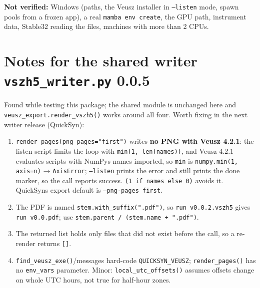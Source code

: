 \documentclass[10pt,a4paper]{article}
\providecommand{\tightlist}{\setlength{\itemsep}{0pt}\setlength{\parskip}{0pt}}
\begin{document}
\textbf{Not verified:} Windows (paths, the Veusz installer in \texttt{--listen} mode,
spawn pools from a frozen app), a real \texttt{mamba env create}, the GPU path,
instrument data, Stable32 reading the files, machines with more than 2 CPUs.


\hypertarget{notes-for-the-shared-writer-vszh5_writerpy-005}{%
\section{\texorpdfstring{Notes for the shared writer \texttt{vszh5\_writer.py} 0.0.5}{Notes for the shared writer vszh5\_writer.py 0.0.5}}\label{notes-for-the-shared-writer-vszh5_writerpy-005}}

Found while testing this package; the shared module is unchanged here and
\texttt{veusz\_\allowbreak{}export.\allowbreak{}render\_\allowbreak{}vszh5()} works around all four. Worth fixing in the next
writer release (QuickSyn):

\begin{enumerate}
\def\labelenumi{\arabic{enumi}.}
\tightlist
\item
  \texttt{render\_\allowbreak{}pages(png\_\allowbreak{}pages=\allowbreak{}"first")} writes \textbf{no PNG with Veusz 4.2.1}: the
  listen script limits the loop with \texttt{min(1,\allowbreak{} len(names))}, and Veusz 4.2.1
  evaluates scripts with NumPy\textquotesingle s names imported, so \texttt{min} is
  \texttt{numpy.\allowbreak{}min(1,\allowbreak{} axis=\allowbreak{}n)} → \texttt{AxisError}; \texttt{--listen} prints the error and
  still prints the done marker, so the call reports success.
  \texttt{(1 if names else 0)} avoids it. QuickSyn\textquotesingle s export default is
  \texttt{--png-pages first}.
\item
  The PDF is named \texttt{stem.\allowbreak{}with\_\allowbreak{}suffix(".\allowbreak{}pdf")}, so \texttt{run v0.\allowbreak{}0.\allowbreak{}2.\allowbreak{}vszh5} gives
  \texttt{run v0.\allowbreak{}0.pdf}; use \texttt{stem.\allowbreak{}parent /\allowbreak{} (stem.\allowbreak{}name + ".\allowbreak{}pdf")}.
\item
  The returned list holds only files that did not exist before the call, so
  a re-render returns \texttt{[]}.
\item
  \texttt{find\_\allowbreak{}veusz\_\allowbreak{}exe()}/messages hard-code \texttt{QUICKSYN\_\allowbreak{}VEUSZ}; \texttt{render\_\allowbreak{}pages()}
  has no \texttt{env\_\allowbreak{}vars} parameter. Minor: \texttt{local\_\allowbreak{}utc\_\allowbreak{}offsets()} assumes offsets
  change on whole UTC hours, not true for half-hour zones.
\end{enumerate}
\end{document}
